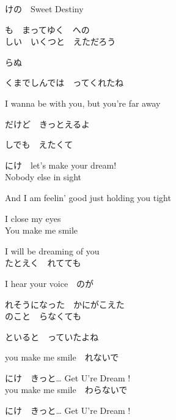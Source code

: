 {けの　Sweet Destiny

も　まってゆく　への
\\

しい　いくつと　えただろう

らぬ

くまでしんでは　ってくれたね

I wanna be with you, but you're far away

だけど　きっとえるよ

しでも　えたくて

にけ　let's make your dream!
\\

Nobody else in sight

And I am feelin' good just holding you tight

I close my eyes
\\

You make me smile

I will be dreaming of you
\\

たとえく　れてても

I hear your voice　のが

れそうになった　かにがこえた
\\

のこと　らなくても

といると　っていたよね

you make me smile　れないで

にけ　きっと… Get U're Dream !
\\

you make me smile　わらないで

にけ　きっと… Get U're Dream !

}